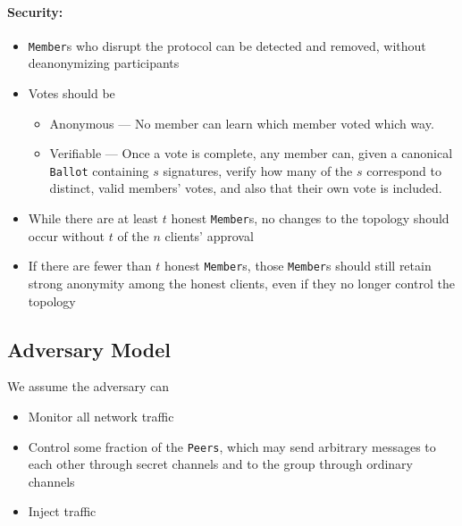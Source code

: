 \paragraph{Security:}
\begin{itemize}
  \item \texttt{Member}s who disrupt the protocol can be detected and removed,
    without deanonymizing participants
  \item  Votes should be
  \begin{itemize}
    \item Anonymous --- No member can learn which member voted which way.
    \item Verifiable --- Once a vote is complete, any member can, given
      a canonical \texttt{Ballot} containing $s$ signatures, verify how many
      of the $s$ correspond to distinct, valid members' votes, and also that
      their own vote is included.
  \end{itemize}
  \item While there are at least $t$ honest \texttt{Member}s, no changes to the
    topology should occur without $t$ of the $n$ clients' approval
  \item If there are fewer than $t$ honest \texttt{Member}s, those
    \texttt{Member}s should still retain strong anonymity among the honest
    clients, even if they no longer control the topology
\end{itemize}
\subsection{Adversary Model}
We assume the adversary can
\begin{itemize}
  \item Monitor all network traffic
  \item Control some fraction of the \texttt{Peers}, which may send arbitrary
    messages to each other through secret channels and to the group through
    ordinary channels
  \item Inject traffic
\end{itemize}
